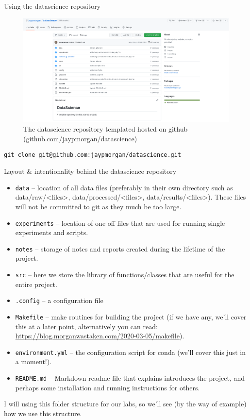 \documentclass[10pt]{beamer}
\begin{document}
\begin{frame}[label={sec:orgec4827e},fragile]{Using the datascience repository}
 \begin{figure}[htbp]
\centering
\includegraphics[width=.9\linewidth]{images/datascience-repo.png}
\caption{The datascience repository templated hosted on github (github.com/jaypmorgan/datascience)}
\end{figure} 

\begin{verbatim}
git clone git@github.com:jaypmorgan/datascience.git
\end{verbatim}
\end{frame}

\begin{frame}[fragile,allowframebreaks,label=]{Layout \& intentionality behind the datascience repository}
 \begin{itemize}
\item \texttt{data} -- location of all data files (preferably in their own directory such as
data/raw/<files>, data/processed/<files>, data/results/<files>). These files will
not be committed to git as they much be too large.
\item \texttt{experiments} -- location of one off files that are used for running single
experiments and scripts.
\item \texttt{notes} -- storage of notes and reports created during the lifetime of the project.
\item \texttt{src} -- here we store the library of functions/classes that are useful for the
entire project.
\item \texttt{.config} -- a configuration file
\item \texttt{Makefile} -- make routines for building the project (if we have any, we'll cover
this at a later point, alternatively you can read:
\url{https://blog.morganwastaken.com/2020-03-05/makefile}).
\item \texttt{environment.yml} -- the configuration script for conda (we'll cover this just in a
moment!).
\item \texttt{README.md} -- Markdown readme file that explains introduces the project, and perhaps
some installation and running instructions for others.
\end{itemize}

I will using this folder structure for our labs, so we'll see (by the way of example)
how we use this structure.
\end{frame}
\end{document}
